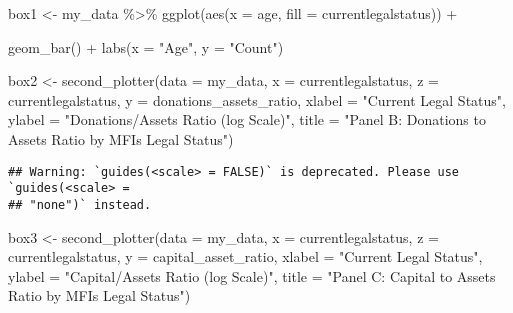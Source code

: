 \documentclass[a4paper,nobind]{templates/ociamthesis}
\newenvironment{Shaded}{\begin{snugshade}}{\end{snugshade}}
\newcommand{\AttributeTok}[1]{\textcolor[rgb]{0.77,0.63,0.00}{#1}}
\newcommand{\FunctionTok}[1]{\textcolor[rgb]{0.00,0.00,0.00}{#1}}
\newcommand{\NormalTok}[1]{#1}
\newcommand{\OtherTok}[1]{\textcolor[rgb]{0.56,0.35,0.01}{#1}}
\newcommand{\SpecialCharTok}[1]{\textcolor[rgb]{0.00,0.00,0.00}{#1}}
\newcommand{\StringTok}[1]{\textcolor[rgb]{0.31,0.60,0.02}{#1}}
\renewenvironment{Shaded}
{
  \vspace{10pt}%
  \begin{snugshade}%
}{%
  \end{snugshade}%
  \vspace{8pt}%
}
\begin{document}
\newpage
\begin{landscape}

\begin{Shaded}
\begin{Highlighting}[]
\NormalTok{box1 }\OtherTok{\textless{}{-}}\NormalTok{ my\_data }\SpecialCharTok{\%\textgreater{}\%} \FunctionTok{ggplot}\NormalTok{(}\FunctionTok{aes}\NormalTok{(}\AttributeTok{x =}\NormalTok{ age, }\AttributeTok{fill =}\NormalTok{ currentlegalstatus)) }\SpecialCharTok{+} 
  
  \FunctionTok{geom\_bar}\NormalTok{() }\SpecialCharTok{+} \FunctionTok{labs}\NormalTok{(}\AttributeTok{x =} \StringTok{"Age"}\NormalTok{, }\AttributeTok{y =} \StringTok{"Count"}\NormalTok{)}


\NormalTok{box2 }\OtherTok{\textless{}{-}} \FunctionTok{second\_plotter}\NormalTok{(}\AttributeTok{data =}\NormalTok{ my\_data, }\AttributeTok{x =}\NormalTok{ currentlegalstatus, }
        \AttributeTok{z =}\NormalTok{ currentlegalstatus,}
        \AttributeTok{y =}\NormalTok{ donations\_assets\_ratio, }
        \AttributeTok{xlabel =} \StringTok{"Current Legal Status"}\NormalTok{, }
        \AttributeTok{ylabel =} \StringTok{"Donations/Assets Ratio (log Scale)"}\NormalTok{, }
        \AttributeTok{title =} \StringTok{"Panel B: Donations to Assets Ratio by MFIs Legal Status"}\NormalTok{)}
\end{Highlighting}
\end{Shaded}

\begin{verbatim}
## Warning: `guides(<scale> = FALSE)` is deprecated. Please use `guides(<scale> =
## "none")` instead.
\end{verbatim}

\begin{Shaded}
\begin{Highlighting}[]
\NormalTok{box3 }\OtherTok{\textless{}{-}} \FunctionTok{second\_plotter}\NormalTok{(}\AttributeTok{data =}\NormalTok{ my\_data, }\AttributeTok{x =}\NormalTok{ currentlegalstatus, }
        \AttributeTok{z =}\NormalTok{ currentlegalstatus,}
        \AttributeTok{y =}\NormalTok{ capital\_asset\_ratio, }
        \AttributeTok{xlabel =} \StringTok{"Current Legal Status"}\NormalTok{, }
        \AttributeTok{ylabel =} \StringTok{"Capital/Assets Ratio (log Scale)"}\NormalTok{, }
        \AttributeTok{title =} \StringTok{"Panel C: Capital to Assets Ratio by MFIs Legal Status"}\NormalTok{)}
\end{Highlighting}
\end{Shaded}


\end{landscape}
\end{document}
